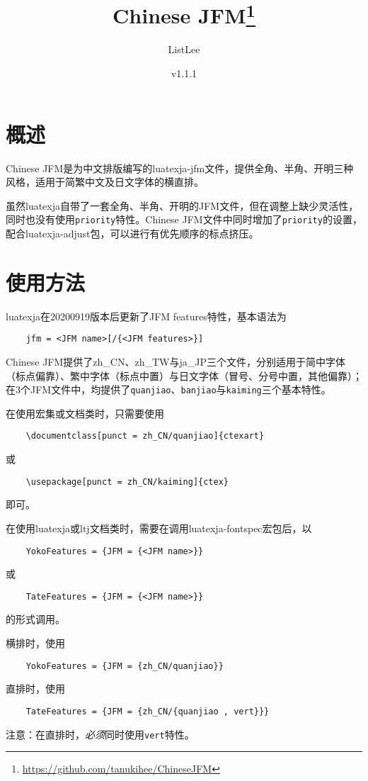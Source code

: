 \documentclass[a4paper , zihao=-4 , fontset=adobe , punct=zh_CN/kaiming]{ctexart}
\title{\textbf{\textsf{Chinese JFM}}\thanks{\url{https://github.com/tanukihee/ChineseJFM}}}
\author{ListLee}
\date{\zhtoday \qquad v1.1.1}
\begin{document}
\maketitle

\section{概述}
\textsf{Chinese JFM}是为中文排版编写的luatexja-jfm文件，提供全角、半角、开明三种风格，适用于简繁中文及日文字体的横直排。

虽然\textsf{luatexja}自带了一套全角、半角、开明的JFM文件，但在调整上缺少灵活性，同时也没有使用\+\verb|priority|特性。\textsf{Chinese JFM}文件中同时增加了\+\verb|priority|的设置，配合\textsf{luatexja-adjust}包，可以进行有优先顺序的标点挤压。\label{sec:pr}

\section{使用方法}
\textsf{luatexja}在20200919版本后更新了JFM features特性，基本语法为
\begin{verbatim}
    jfm = <JFM name>[/{<JFM features>}]
\end{verbatim}

\textsf{Chinese JFM}提供了\textsf{zh\_CN}、\textsf{zh\_TW}与\textsf{ja\_JP}三个文件，分别适用于简中字体（标点偏靠）、繁中字体（标点中置）与日文字体（冒号、分号中置，其他偏靠）；在3个JFM文件中，均提供了\+\verb|quanjiao|、\verb|banjiao|与\+\verb|kaiming|三个基本特性。

在使用\CTeX{}宏集或文档类时，只需要使用
\begin{verbatim}
    \documentclass[punct = zh_CN/quanjiao]{ctexart}
\end{verbatim}
或
\begin{verbatim}
    \usepackage[punct = zh_CN/kaiming]{ctex}
\end{verbatim}
即可。

在使用\textsf{luatexja}或\textsf{ltj}文档类时，需要在调用\textsf{luatexja-fontspec}宏包后，以\begin{verbatim}
    YokoFeatures = {JFM = {<JFM name>}}
\end{verbatim}
或
\begin{verbatim}
    TateFeatures = {JFM = {<JFM name>}}
\end{verbatim}
的形式调用。

横排时，使用
\begin{verbatim}
    YokoFeatures = {JFM = {zh_CN/quanjiao}}
\end{verbatim}
直排时，使用
\begin{verbatim}
    TateFeatures = {JFM = {zh_CN/{quanjiao , vert}}}
\end{verbatim}
{\color{red}注意：在直排时，\emph{必须}同时使用\+\verb|vert|特性。}
\end{document}
